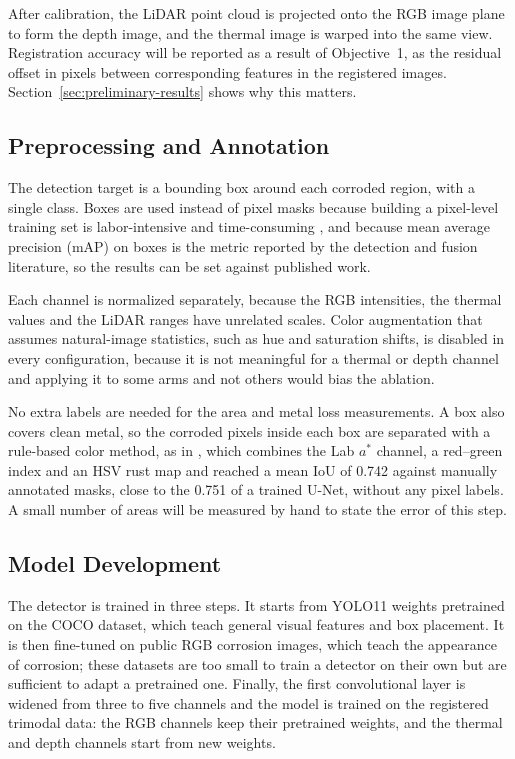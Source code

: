 After calibration, the LiDAR point cloud is projected onto the RGB image plane to
form the depth image, and the thermal image is warped into the same view.
Registration accuracy will be reported as a result of Objective~1, as the
residual offset in pixels between corresponding features in the registered
images. Section~\ref{sec:preliminary-results} shows why this matters.

\subsection{Preprocessing and Annotation}
\label{sec:annotation}

The detection target is a bounding box around each corroded region, with a
single class. Boxes are used instead of pixel masks because building a
pixel-level training set is labor-intensive and time-consuming \citep{Lim2021},
and because mean average precision (mAP) on boxes is the metric reported by the
detection and fusion literature, so the results can be set against published
work.

Each channel is normalized separately, because the RGB intensities, the thermal
values and the LiDAR ranges have unrelated scales. Color augmentation that
assumes natural-image statistics, such as hue and saturation shifts, is disabled
in every configuration, because it is not meaningful for a thermal or depth
channel and applying it to some arms and not others would bias the ablation.

No extra labels are needed for the area and metal loss measurements. A box also
covers clean metal, so the corroded pixels inside each box are separated with a
rule-based color method, as in \citet{Alvani2026}, which combines the Lab
$a^*$ channel, a red--green index and an HSV rust map and reached a mean IoU of
0.742 against manually annotated masks, close to the 0.751 of a trained U-Net,
without any pixel labels. A small number of areas will be measured by hand to
state the error of this step.

\subsection{Model Development}
\label{sec:model}

The detector is trained in three steps. It starts from YOLO11 weights pretrained
on the COCO dataset, which teach general visual features and box placement. It
is then fine-tuned on public RGB corrosion images, which teach the appearance of
corrosion; these datasets are too small to train a detector on their own but are
sufficient to adapt a pretrained one. Finally, the first convolutional layer is
widened from three to five channels and the model is trained on the registered
trimodal data: the RGB channels keep their pretrained weights, and the thermal
and depth channels start from new weights.

